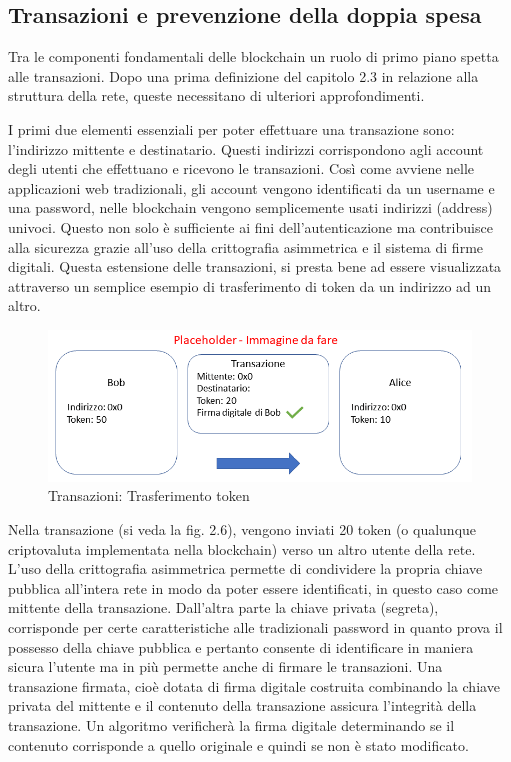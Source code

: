 \subsection{Transazioni e prevenzione della doppia spesa}

Tra le componenti fondamentali delle blockchain un ruolo di primo piano spetta alle transazioni. Dopo una prima definizione del capitolo 2.3 in relazione alla struttura della rete, queste necessitano di ulteriori approfondimenti.

I primi due elementi essenziali per poter effettuare una transazione sono: l’indirizzo mittente e destinatario. Questi indirizzi corrispondono agli account degli utenti che effettuano e ricevono le transazioni. Così come avviene nelle applicazioni web tradizionali, gli account vengono identificati da un username e una password, nelle blockchain vengono semplicemente usati indirizzi (address) univoci. Questo non solo è sufficiente ai fini dell’autenticazione ma contribuisce alla sicurezza grazie all’uso della crittografia asimmetrica e il sistema di firme digitali. Questa estensione delle transazioni, si presta bene ad essere visualizzata attraverso un semplice esempio di trasferimento di token da un indirizzo ad un altro.

\begin{figure}[H]
\centering
\includegraphics[width=1\textwidth]{immagini/transazionetest.png}
\caption{Transazioni: Trasferimento token}
\label{fig:meshtest5}
\end{figure}

Nella transazione (si veda la fig. 2.6), vengono inviati 20 token (o qualunque criptovaluta implementata nella blockchain) verso un altro utente della rete. L’uso della crittografia asimmetrica permette di condividere la propria chiave pubblica all’intera rete in modo da poter essere identificati, in questo caso come mittente della transazione. Dall’altra parte la chiave privata (segreta), corrisponde per certe caratteristiche alle tradizionali password in quanto prova il possesso della chiave pubblica e pertanto consente di identificare in maniera sicura l’utente ma in più permette anche di firmare le transazioni. Una transazione firmata, cioè dotata di firma digitale costruita combinando la chiave privata del mittente e il contenuto della transazione assicura l’integrità della transazione. Un algoritmo verificherà la firma digitale determinando se il contenuto corrisponde a quello originale e quindi se non è stato modificato.

